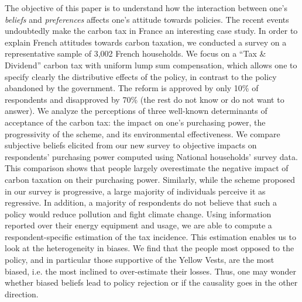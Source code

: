 \documentclass[11pt]{article}
\begin{document}
The objective of this paper is to understand how the interaction between one's \textit{beliefs} and \textit{preferences} affects one's attitude towards policies. The recent events undoubtedly make the carbon tax in France an interesting case study. In order to explain French attitudes towards carbon taxation, we conducted a survey on a representative sample of 3,002 French households. We focus on a ``Tax \& Dividend'' carbon tax with uniform lump sum compensation, which allows one to specify clearly the distributive effects of the policy, in contrast to the policy abandoned by the government. The reform is approved by only 10\% of respondents and disapproved by 70\% (the rest do not know or do not want to answer). We analyze the perceptions of three well-known determinants of acceptance of the carbon tax: the impact on one's purchasing power, the progressivity of the scheme, and its environmental effectiveness. We compare subjective beliefs elicited from our new survey to objective impacts on respondents' purchasing power computed using National households' survey data. This comparison shows that people largely overestimate the negative impact of carbon taxation on their purchasing power. Similarly, while the scheme proposed in our survey is progressive, a large majority of individuals perceive it as regressive. In addition, a majority of respondents do not believe that such a policy would reduce pollution and fight climate change. Using information reported over their energy equipment and usage, we are able to compute a respondent-specific estimation of the tax incidence. This estimation enables us to look at the heterogeneity in biases. We find that the people most opposed to the policy, and in particular those supportive of the Yellow Vests, are the most biased, i.e. the most inclined to over-estimate their losses. Thus, one may wonder whether biased beliefs lead to policy rejection or if the causality goes in the other direction.
\end{document}
